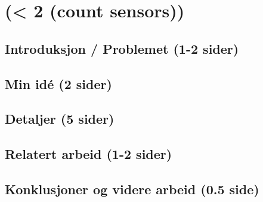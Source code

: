 \section{(< 2 (count sensors))}
\subsection{Introduksjon / Problemet (1-2 sider)}

\subsection{Min idé (2 sider)}

\subsection{Detaljer (5 sider)}

\subsection{Relatert arbeid (1-2 sider)}

\subsection{Konklusjoner og videre arbeid (0.5 side)}
